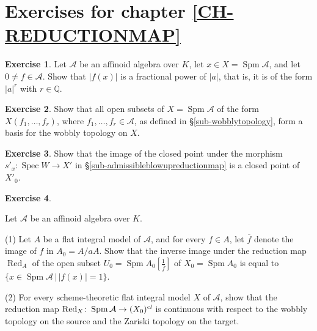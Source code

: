 \documentclass[a4paper,12pt, dvipdfmx]{jsbook}
\def\Q{\mathbb{Q}}
\def\ovl#1{\overline{#1}}%
\def\Red{\mathop{\mathrm{Red}}\nolimits}
\def\cl{\mathop{\textsl{cl}}\nolimits}
\def\Spec{\mathop{\mathrm{Spec}}\nolimits}
\def\Spm{\mathop{\mathrm{Spm}}\nolimits}
\newcommand{\abs}[1]{\lvert#1\rvert}
\theoremstyle{plain}
\theoremstyle{definition}
\newtheorem{exer}{\bfseries Exercise}[chapter]
\begin{document}
\section*{Exercises for chapter \ref{CH-REDUCTIONMAP}}
\begin{exer}\label{exer-rationalityofnorms}{\rm 
Let $\mathcal{A}$ be an affinoid algebra over $K$, let $x\in X=\Spm\mathcal{A}$, and let $0\neq f\in\mathcal{A}$.
Show that $\abs{f(x)}$ is a fractional power of $\abs{a}$, that is, it is of the form $\abs{a}^r$ with $r\in\Q$.}
\end{exer}

\begin{exer}\label{exer-wobblytopologybasis}{\rm 
Show that all open subsets of $X=\Spm\mathcal{A}$ of the form $X(f_1,\ldots,f_r)$, where $f_1,\ldots,f_r\in\mathcal{A}$, as defined in \S\ref{sub-wobblytopology}, form a basis for the wobbly topology on $X$.}
\end{exer}

\begin{exer}\label{exer-admissibleblowupreductionmap}{\rm 
Show that the image of the closed point under the morphism $s'_x\colon\Spec W\rightarrow X'$ in \S\ref{sub-admissibleblowupreductionmap} is a closed point of $X'_0$.}
\end{exer}

\begin{exer}\label{exer-reductionmapcontinuous}{\rm 
Let $\mathcal{A}$ be an affinoid algebra over $K$.

(1) Let $A$ be a flat integral model of $\mathcal{A}$, and for every $f\in A$, let $\ovl{f}$ denote the image of $f$ in $A_0=A/aA$.
Show that the inverse image under the reduction map $\Red_A$ of the open subset $U_0=\Spm A_0[\frac{1}{\ovl{f}}]$ of $X_0=\Spm A_0$ is equal to $\{x\in\Spm\mathcal{A}\,|\,\abs{f(x)}=1\}$.

(2) For every scheme-theoretic flat integral model $X$ of $\mathcal{A}$, show that the reduction map $\Red_X\colon\Spm\mathcal{A}\rightarrow(X_0)^{\cl}$ is continuous with respect to the wobbly topology on the source and the Zariski topology on the target.}
\end{exer}
\end{document}
